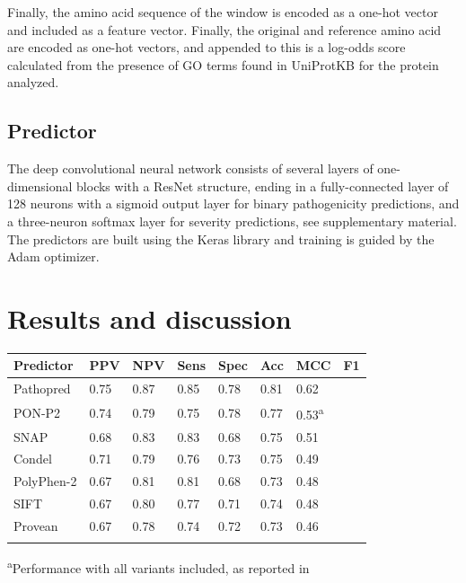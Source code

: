 \documentclass{bioinfo}
\begin{document}
\begin{methods}
Finally, the amino acid sequence of the window is encoded as a one-hot
vector and included as a feature vector. Finally, the original and
reference amino acid are encoded as one-hot vectors, and appended to
this is a log-odds score calculated from the presence of GO terms
found in UniProtKB for the protein analyzed.

\subsection{Predictor}

The deep convolutional neural network consists of several layers of
one-dimensional blocks with a ResNet structure, ending in a
fully-connected layer of 128 neurons with a sigmoid output layer for
binary pathogenicity predictions, and a three-neuron softmax layer for
severity predictions, see supplementary material. The predictors are
built using the Keras library \citep{Chollet2017} and training is
guided by the Adam optimizer.

\end{methods}

\section{Results and discussion}

\begin{table}[!t]
 {\begin{tabular}{@{}llllllll@{}}\toprule 
Predictor & PPV & NPV & Sens & Spec & Acc & MCC & F1\\\midrule
Pathopred & 0.75 & 0.87 & 0.85 & 0.78 & 0.81 & 0.62\\
PON-P2 & 0.74 & 0.79 & 0.75 & 0.78 & 0.77 & 0.53\textsuperscript{a}\\
SNAP & 0.68 & 0.83 & 0.83 & 0.68 & 0.75 & 0.51\\
Condel & 0.71 & 0.79 & 0.76 & 0.73 & 0.75 & 0.49\\
PolyPhen-2 & 0.67 & 0.81 & 0.81 & 0.68 & 0.73 & 0.48\\
SIFT & 0.67 & 0.80 & 0.77 & 0.71 & 0.74 & 0.48\\
Provean & 0.67 & 0.78 & 0.74 & 0.72 & 0.73 & 0.46\\\botrule
\end{tabular}}{\textsuperscript{a}Performance with all variants included, as reported in \citep{Niroula2015}}
\end{table}
\end{document}
